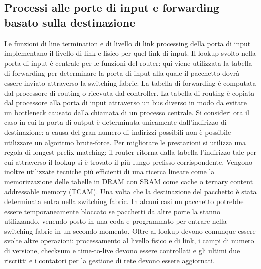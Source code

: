 \subsection{Processi alle porte di input e forwarding basato sulla destinazione}
Le funzioni di line termination e di livello di link processing della porta di input implementano il livello di link e fisico per quel link di input. Il 
lookup svolto nella porta di input \`e centrale per le funzioni del router: qui viene utilizzata la tabella di forwarding per determinare la porta di input
alla quale il pacchetto dovr\`a essere inviato attraverso la switching fabric. La tabella di forwarding \`e computata dal processore di routing o ricevuta dal
controller. La tabella di routing \`e copiata dal processore alla porta di input attraverso un bus diverso in modo da evitare un bottleneck causato dalla
chiamata di un processo centrale. Si consideri ora il caso in cui la porta di output \`e determinata unicamente dall'indirizzo di destinazione: a causa
del gran numero di indirizzi possibili non \`e possibile utilizzare un algoritmo brute-force. Per migliorare le prestazioni si utilizza una regola di 
longest prefix matching: il router ritorna dalla tabella l'indirizzo tale per cui attraverso il lookup si \`e trovato il pi\`u lungo prefisso 
corrispondente. Vengono inoltre utilizzate tecniche pi\`u efficienti di una ricerca lineare come la memorizzazione delle tabelle in DRAM con SRAM come
cache o ternary content addressable memory (TCAM). Una volta che la destinazione del pacchetto \`e stata determinata entra nella switching fabric. In alcuni
casi un pacchetto potrebbe essere temporaneamente bloccato se pacchetti da altre porte la stanno utilizzando, venendo posto in una coda e programmato per
entrare nella switching fabric in un secondo momento. Oltre al lookup devono comunque essere svolte altre operazioni: processamento al livello fisico e di
link, i campi di numero di versione, checksum e time-to-live devono essere controllati e gli ultimi due riscritti e i contatori per la gestione di rete 
devono essere aggiornati.
